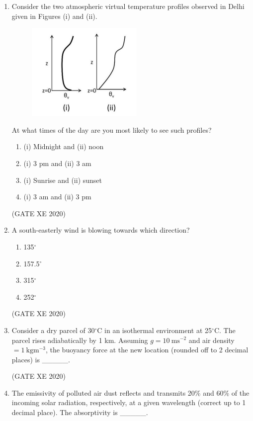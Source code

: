 \documentclass[12pt]{article}
\begin{document}
\begin{enumerate}
\item Consider the two atmospheric virtual temperature profiles observed in Delhi given in Figures (i) and (ii).  

\begin{figure}[H]
    \centering
    \includegraphics[width=0.5\columnwidth]{figs/ass4_h_q5.png}
    \caption{}
    \label{fig:placeholder}
\end{figure}

At what times of the day are you most likely to see such profiles?  
\begin{enumerate}
\item (i) Midnight and (ii) noon
\item (i) 3 pm and (ii) 3 am
\item (i) Sunrise and (ii) sunset
\item (i) 3 am and (ii) 3 pm
\end{enumerate}
(GATE XE 2020)

\item A south-easterly wind is blowing towards which direction?
\begin{enumerate}
\item 135$^{\circ}$
\item 157.5$^{\circ}$
\item 315$^{\circ}$
\item 252$^{\circ}$
\end{enumerate}
(GATE XE 2020)

\item Consider a dry parcel of 30$^{\circ}$C in an isothermal environment at 25$^{\circ}$C. The parcel rises adiabatically by 1 km. Assuming $g=10\ \mathrm{ms^{-2}}$ and air density $=1\ \mathrm{kgm^{-3}}$, the buoyancy force at the new location (rounded off to 2 decimal places) is \_\_\_\_\_.  

(GATE XE 2020)

\item The emissivity of polluted air dust reflects and transmits 20\% and 60\% of the incoming solar radiation, respectively, at a given wavelength (correct up to 1 decimal place). The absorptivity is \_\_\_\_\_.  


\end{enumerate}
\end{document}
